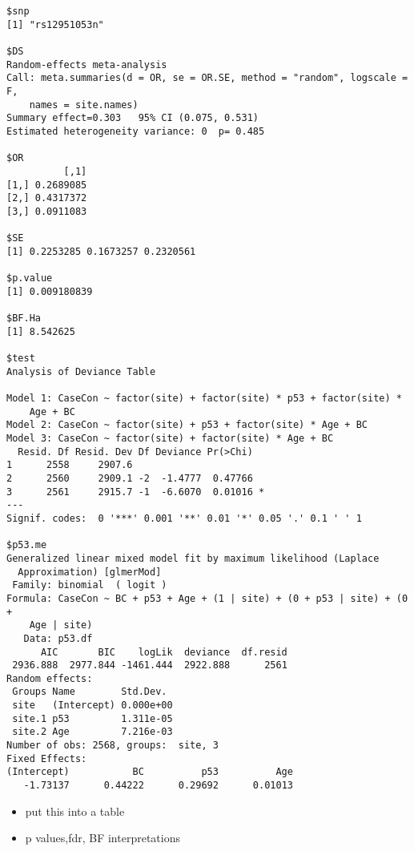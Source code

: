 \documentclass[12pt,twoside]{dukestatscithesis}
\providecommand{\tightlist}{%
  \setlength{\itemsep}{0pt}\setlength{\parskip}{0pt}}
\theoremstyle{definition}
\theoremstyle{definition}
\theoremstyle{definition}
\theoremstyle{remark}
\begin{document}
\begin{verbatim}
$snp
[1] "rs12951053n"

$DS
Random-effects meta-analysis
Call: meta.summaries(d = OR, se = OR.SE, method = "random", logscale = F, 
    names = site.names)
Summary effect=0.303   95% CI (0.075, 0.531)
Estimated heterogeneity variance: 0  p= 0.485 

$OR
          [,1]
[1,] 0.2689085
[2,] 0.4317372
[3,] 0.0911083

$SE
[1] 0.2253285 0.1673257 0.2320561

$p.value
[1] 0.009180839

$BF.Ha
[1] 8.542625

$test
Analysis of Deviance Table

Model 1: CaseCon ~ factor(site) + factor(site) * p53 + factor(site) * 
    Age + BC
Model 2: CaseCon ~ factor(site) + p53 + factor(site) * Age + BC
Model 3: CaseCon ~ factor(site) + factor(site) * Age + BC
  Resid. Df Resid. Dev Df Deviance Pr(>Chi)  
1      2558     2907.6                       
2      2560     2909.1 -2  -1.4777  0.47766  
3      2561     2915.7 -1  -6.6070  0.01016 *
---
Signif. codes:  0 '***' 0.001 '**' 0.01 '*' 0.05 '.' 0.1 ' ' 1

$p53.me
Generalized linear mixed model fit by maximum likelihood (Laplace
  Approximation) [glmerMod]
 Family: binomial  ( logit )
Formula: CaseCon ~ BC + p53 + Age + (1 | site) + (0 + p53 | site) + (0 +  
    Age | site)
   Data: p53.df
      AIC       BIC    logLik  deviance  df.resid 
 2936.888  2977.844 -1461.444  2922.888      2561 
Random effects:
 Groups Name        Std.Dev. 
 site   (Intercept) 0.000e+00
 site.1 p53         1.311e-05
 site.2 Age         7.216e-03
Number of obs: 2568, groups:  site, 3
Fixed Effects:
(Intercept)           BC          p53          Age  
   -1.73137      0.44222      0.29692      0.01013  
\end{verbatim}
\begin{itemize}
\tightlist
\item
  put this into a table
\item
  p values,fdr, BF interpretations
\end{itemize}
\end{document}
